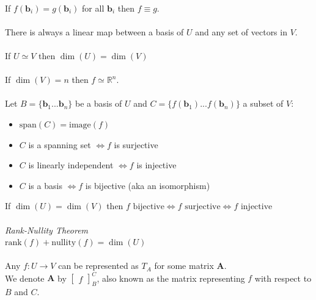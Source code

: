 \documentclass{scrartcl}
\newcommand{\R}{\mathbb{R}}
\renewcommand{\vec}[1]{\mathbf{#1}}
\begin{document}
\\
If $ f(\vec{b}_{i}) = g(\vec{b}_{i}) $ for all $ \vec{b}_{i} $ then $ f \equiv g $.
\\\\
There is always a linear map between a basis of $ U $ and any set of vectors in $ V $.
\\\\
If $ U \simeq V $ then $ \dim(U) = \dim(V) $
\\\\
If $ \dim(V) = n $ then $ f \simeq \R^{n} $.
\\\\
Let $ B = \{\vec{b}_{1}...\vec{b}_{n}\} $ be a basis of $ U $ and $ C = \{f(\vec{b}_{1})...f(\vec{b}_{n})\} $ a subset of $ V $:
\begin{itemize}
\item $ \textrm{span}(C) = \textrm{image}(f) $
\item $ C $ is a spanning set $ \Leftrightarrow f $ is surjective
\item $ C $ is linearly independent $ \Leftrightarrow f $ is injective
\item $ C $ is a basis $ \Leftrightarrow f $ is bijective (aka an isomorphism)
\end{itemize}
If $ \dim(U) = \dim(V) $ then $ f \textrm{ bijective} \Leftrightarrow f \textrm{ surjective} \Leftrightarrow f \textrm{ injective} $
\\\\
\textit{Rank-Nullity Theorem}
\\
$ \textrm{rank}(f) + \textrm{nullity}(f) = \dim(U) $
\\\\
Any $ f : U \to V $ can be represented as $ T_{A} $ for some matrix $ \vec{A} $.
\\
We denote $ \vec{A} $ by $
\begin{bmatrix}
f
\end{bmatrix}_{B}^{C} $, also known as the matrix representing $ f $ with respect to $ B $ and $ C $.
\\
\end{document}
